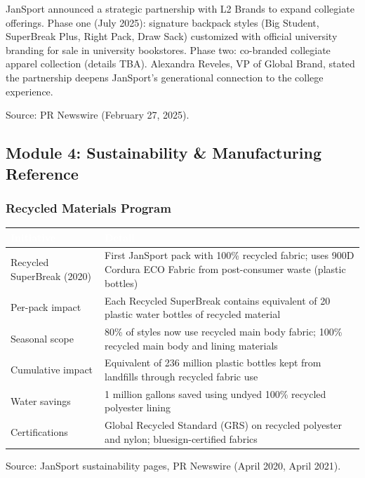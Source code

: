 \documentclass[11pt,letterpaper]{article}
\newcommand{\tableheader}[1]{\textbf{\sffamily\textcolor{white}{#1}}}
\begin{document}
JanSport announced a strategic partnership with L2 Brands to expand collegiate offerings. Phase one (July 2025): signature backpack styles (Big Student, SuperBreak Plus, Right Pack, Draw Sack) customized with official university branding for sale in university bookstores. Phase two: co-branded collegiate apparel collection (details TBA). Alexandra Reveles, VP of Global Brand, stated the partnership deepens JanSport's generational connection to the college experience.

Source: PR Newswire (February 27, 2025).

\subsection{Module 4: Sustainability \& Manufacturing Reference}

\subsubsection{Recycled Materials Program}

\begin{center}
\begin{tabularx}{\textwidth}{L{4cm}X}
\toprule
{}
\tableheader{Initiative} & \tableheader{Detail} \\
\midrule
Recycled SuperBreak (2020) & First JanSport pack with 100\% recycled fabric; uses 900D Cordura ECO Fabric from post-consumer waste (plastic bottles) \\
Per-pack impact & Each Recycled SuperBreak contains equivalent of 20 plastic water bottles of recycled material \\
Seasonal scope & 80\% of styles now use recycled main body fabric; 100\% recycled main body and lining materials \\
Cumulative impact & Equivalent of 236 million plastic bottles kept from landfills through recycled fabric use \\
Water savings & 1 million gallons saved using undyed 100\% recycled polyester lining \\
Certifications & Global Recycled Standard (GRS) on recycled polyester and nylon; bluesign-certified fabrics \\
\bottomrule
\end{tabularx}
\end{center}

Source: JanSport sustainability pages, PR Newswire (April 2020, April 2021).
\end{document}
